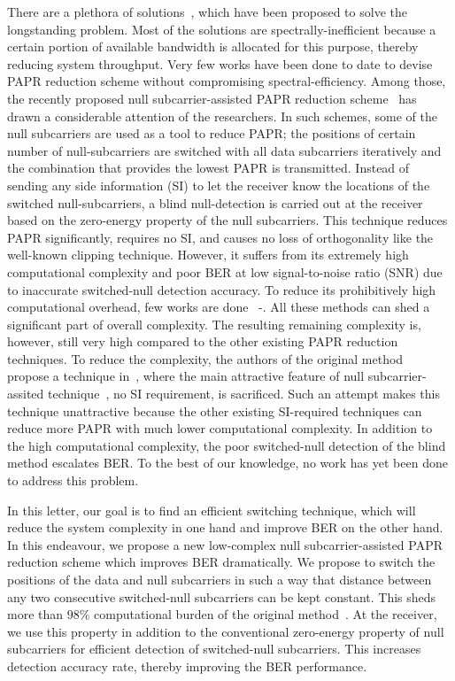 \documentclass[journal,comsoc]{IEEEtran}
\begin{document}
There are a plethora of solutions~\cite{IEEEhowto:rahmat}, which have been proposed to solve the longstanding problem. Most of the solutions are spectrally-inefficient because a certain portion of available bandwidth is allocated for this purpose, thereby reducing system throughput. Very few works have been done to date to devise PAPR reduction scheme without compromising spectral-efficiency. Among those, the recently proposed null subcarrier-assisted PAPR reduction scheme~\cite{IEEEhowto:wong1} has drawn a considerable attention of the researchers. In such schemes, some of the null subcarriers are used as a tool to reduce PAPR; the positions of certain number of null-subcarriers are switched with all data subcarriers iteratively and the combination that provides the lowest PAPR is transmitted. Instead of sending any side information (SI) to let the receiver know the locations of the switched null-subcarriers, a blind null-detection is carried out at the receiver based on the zero-energy property of the null subcarriers. This technique reduces PAPR significantly, requires no SI, and causes no loss of orthogonality like the well-known clipping technique. However, it suffers from its extremely high computational complexity and poor BER at low signal-to-noise ratio (SNR) due to inaccurate switched-null detection accuracy. To reduce its prohibitively high computational overhead, few works are done~\cite{IEEEhowto:sabbir1} -\cite{IEEEhowto:sabbir3}. All these methods can shed a significant part of overall complexity. The resulting remaining complexity is, however, still very high compared to the other existing PAPR reduction techniques. To reduce the complexity, the authors of the original method~\cite{IEEEhowto:wong1} propose a technique in~\cite{IEEEhowto:wong2}, where the main attractive feature of null subcarrier-assited technique~\cite{IEEEhowto:wong2}, no SI requirement, is sacrificed. Such an attempt makes this technique unattractive because the other existing SI-required techniques can reduce more PAPR with much lower computational complexity. In addition to the high computational complexity, the poor switched-null detection of the blind method escalates BER. To the best of our knowledge, no work has yet been done to address this problem. 

In this letter, our goal is to find an efficient switching technique, which will reduce the system complexity in one hand and improve BER on the other hand. In this endeavour, we propose a new low-complex null subcarrier-assisted PAPR reduction scheme which improves BER dramatically.  We propose to switch the positions of the data and null subcarriers in such a way that distance between any two consecutive switched-null subcarriers can be kept constant. This sheds more than 98\% computational burden of the original method~\cite{IEEEhowto:wong1}. At the receiver, we use this property in addition to the conventional zero-energy property of null subcarriers for efficient detection of switched-null subcarriers. This increases detection accuracy rate, thereby improving the BER performance.
\end{document}
